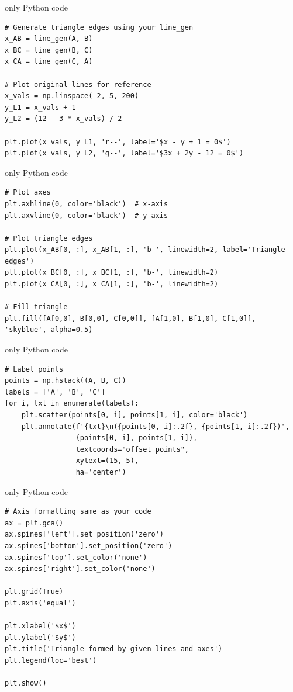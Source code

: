 \documentclass{beamer}
\begin{document}
\begin{frame}[fragile]{only Python code }
\begin{lstlisting}
# Generate triangle edges using your line_gen
x_AB = line_gen(A, B)
x_BC = line_gen(B, C)
x_CA = line_gen(C, A)

# Plot original lines for reference
x_vals = np.linspace(-2, 5, 200)
y_L1 = x_vals + 1
y_L2 = (12 - 3 * x_vals) / 2

plt.plot(x_vals, y_L1, 'r--', label='$x - y + 1 = 0$')
plt.plot(x_vals, y_L2, 'g--', label='$3x + 2y - 12 = 0$')
 \end{lstlisting}
\end{frame}
\begin{frame}[fragile]{only Python code }
\begin{lstlisting}
# Plot axes
plt.axhline(0, color='black')  # x-axis
plt.axvline(0, color='black')  # y-axis

# Plot triangle edges
plt.plot(x_AB[0, :], x_AB[1, :], 'b-', linewidth=2, label='Triangle edges')
plt.plot(x_BC[0, :], x_BC[1, :], 'b-', linewidth=2)
plt.plot(x_CA[0, :], x_CA[1, :], 'b-', linewidth=2)

# Fill triangle
plt.fill([A[0,0], B[0,0], C[0,0]], [A[1,0], B[1,0], C[1,0]], 'skyblue', alpha=0.5)
 \end{lstlisting}
\end{frame}
\begin{frame}[fragile]{only Python code }
\begin{lstlisting}
# Label points
points = np.hstack((A, B, C))
labels = ['A', 'B', 'C']
for i, txt in enumerate(labels):
    plt.scatter(points[0, i], points[1, i], color='black')
    plt.annotate(f'{txt}\n({points[0, i]:.2f}, {points[1, i]:.2f})',
                 (points[0, i], points[1, i]),
                 textcoords="offset points",
                 xytext=(15, 5),
                 ha='center')
 \end{lstlisting}
\end{frame}
\begin{frame}[fragile]{only Python code }
\begin{lstlisting}
# Axis formatting same as your code
ax = plt.gca()
ax.spines['left'].set_position('zero')
ax.spines['bottom'].set_position('zero')
ax.spines['top'].set_color('none')
ax.spines['right'].set_color('none')

plt.grid(True)
plt.axis('equal')

plt.xlabel('$x$')
plt.ylabel('$y$')
plt.title('Triangle formed by given lines and axes')
plt.legend(loc='best')

plt.show()
 \end{lstlisting}
\end{frame}
\end{document}
